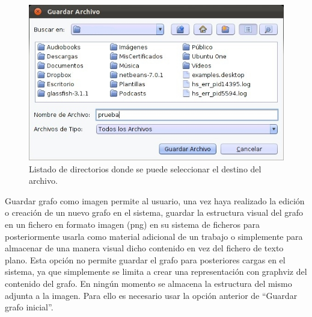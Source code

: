 \begin{figure}[H]
\begin{center}
\includegraphics[width=13cm]{./imagenes_documentacion/imagen_guardar_archivo.jpeg}
\caption{Listado de directorios donde se puede seleccionar el destino del archivo.}
\end{center}
\end{figure}

Guardar grafo como imagen permite al usuario, una vez haya realizado la edición o creación de un nuevo grafo en el sistema, guardar la estructura visual del grafo en un fichero en formato imagen (png) en su sistema de ficheros para posteriormente usarla como material adicional de un trabajo o simplemente para almacenar de una manera visual dicho contenido en vez del fichero de texto plano. Esta opción no permite guardar el grafo para posteriores cargas en el sistema, ya que simplemente se limita a crear una representación con graphviz del contenido del grafo. En ningún momento se almacena la estructura del mismo adjunta a la imagen. Para ello es necesario usar la opción anterior de ``Guardar grafo inicial''.\\

